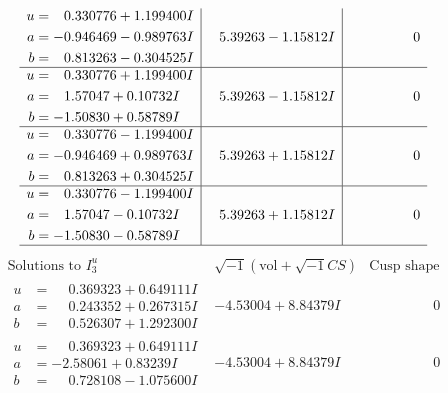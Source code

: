 \documentclass[1p]{elsarticle_modified}
\theoremstyle{definition}
\newcommand{\I}{\sqrt{-1}}
\begin{document}
$$\begin{array}{c|c|c}
\begin{aligned}
u &= \phantom{-}0.330776 + 1.199400 I \\
a &= -0.946469 - 0.989763 I \\
b &= \phantom{-}0.813263 - 0.304525 I\end{aligned}
 & \phantom{-}5.39263 - 1.15812 I & \phantom{-0.000000 } 0 \\ \hline\begin{aligned}
u &= \phantom{-}0.330776 + 1.199400 I \\
a &= \phantom{-}1.57047 + 0.10732 I \\
b &= -1.50830 + 0.58789 I\end{aligned}
 & \phantom{-}5.39263 - 1.15812 I & \phantom{-0.000000 } 0 \\ \hline\begin{aligned}
u &= \phantom{-}0.330776 - 1.199400 I \\
a &= -0.946469 + 0.989763 I \\
b &= \phantom{-}0.813263 + 0.304525 I\end{aligned}
 & \phantom{-}5.39263 + 1.15812 I & \phantom{-0.000000 } 0 \\ \hline\begin{aligned}
u &= \phantom{-}0.330776 - 1.199400 I \\
a &= \phantom{-}1.57047 - 0.10732 I \\
b &= -1.50830 - 0.58789 I\end{aligned}
 & \phantom{-}5.39263 + 1.15812 I & \phantom{-0.000000 } 0\\
 \hline 
 \end{array}$$\newpage$$\begin{array}{c|c|c}  
\text{Solutions to }I^u_{3}& \I (\text{vol} + \sqrt{-1}CS) & \text{Cusp shape}\\
 \hline 
\begin{aligned}
u &= \phantom{-}0.369323 + 0.649111 I \\
a &= \phantom{-}0.243352 + 0.267315 I \\
b &= \phantom{-}0.526307 + 1.292300 I\end{aligned}
 & -4.53004 + 8.84379 I & \phantom{-0.000000 } 0 \\ \hline\begin{aligned}
u &= \phantom{-}0.369323 + 0.649111 I \\
a &= -2.58061 + 0.83239 I \\
b &= \phantom{-}0.728108 - 1.075600 I\end{aligned}
 & -4.53004 + 8.84379 I & \phantom{-0.000000 } 0 \\ \hline\begin{aligned}

\end{aligned}
\end{array}$$
\end{document}
